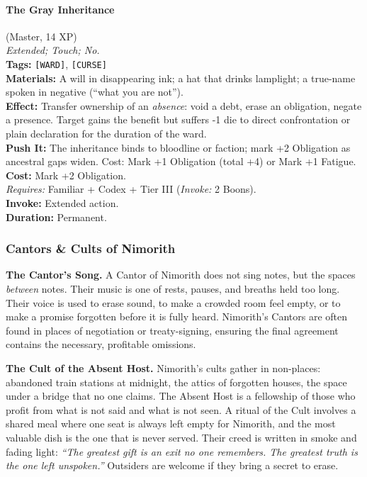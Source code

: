 \paragraph{The Gray Inheritance} (Master, 14 XP) \hfill \\
\emph{Extended; Touch; No.} \\
\textbf{Tags:} \texttt{[WARD]}, \texttt{[CURSE]} \\
\textbf{Materials:} A will in disappearing ink; a hat that drinks lamplight; a true-name spoken in negative (``what you are not''). \\
\textbf{Effect:} Transfer ownership of an \emph{absence}: void a debt, erase an obligation, negate a presence. Target gains the benefit but suffers -1 die to direct confrontation or plain declaration for the duration of the ward. \\
\textbf{Push It:} The inheritance binds to bloodline or faction; mark +2 Obligation as ancestral gaps widen. Cost: Mark +1 Obligation (total +4) or Mark +1 Fatigue. \\
\textbf{Cost:} Mark +2 Obligation. \\
\textit{Requires:} Familiar + Codex + Tier III (\textit{Invoke:} 2 Boons). \\
\textbf{Invoke:} Extended action. \\
\textbf{Duration:} Permanent.

\subsubsection*{Cantors \& Cults of Nimorith}

\textbf{The Cantor's Song.} A Cantor of Nimorith does not sing notes, but the spaces \textit{between} notes. Their music is one of rests, pauses, and breaths held too long. Their voice is used to erase sound, to make a crowded room feel empty, or to make a promise forgotten before it is fully heard. Nimorith's Cantors are often found in places of negotiation or treaty-signing, ensuring the final agreement contains the necessary, profitable omissions.

\textbf{The Cult of the Absent Host.} Nimorith's cults gather in non-places: abandoned train stations at midnight, the attics of forgotten houses, the space under a bridge that no one claims. The Absent Host is a fellowship of those who profit from what is not said and what is not seen. A ritual of the Cult involves a shared meal where one seat is always left empty for Nimorith, and the most valuable dish is the one that is never served. Their creed is written in smoke and fading light: \textit{``The greatest gift is an exit no one remembers. The greatest truth is the one left unspoken.''} Outsiders are welcome if they bring a secret to erase.

